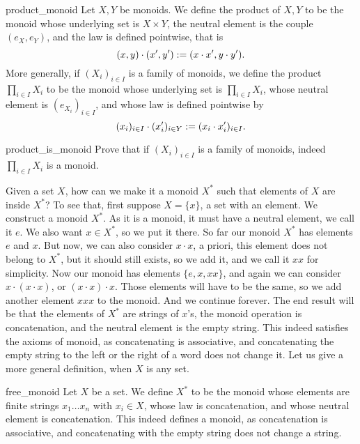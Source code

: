 \begin{cdef}{}{product_monoid}
    Let \( X, Y \) be monoids. We define the product of \( X, Y \) to be the monoid whose underlying set is \( X \times Y \), the neutral element is the couple \( (e_X, e_Y) \), and the law is defined pointwise, that is 
    \begin{equation*}
        (x, y) \cdot (x', y') := (x\cdot x', y \cdot y').
    \end{equation*}
    More generally, if \( (X_i)_{i\in I} \) is a family of monoids, we define the product \( \prod_{i \in I} X_i \) to be the monoid whose underlying set is \( \prod_{i \in I} X_i \), whose neutral element is \( (e_{X_i})_{i \in I} \), and whose law is defined pointwise by
    \begin{equation*}
        (x_i)_{i \in I} \cdot (x'_i)_{i \in Y} := (x_i \cdot x'_i)_{i \in I}.
    \end{equation*}
\end{cdef}

\begin{cex}{}{product_is_monoid}
    Prove that if \( (X_i)_{i\in I} \) is a family of monoids, indeed \( \prod_{i \in I} X_i \) is a monoid.
\end{cex}

Given a set \( X \), how can we make it a monoid \( X^* \) such that elements of \( X \) are inside \( X^* \)? To see that, first suppose \( X = \{ x \} \), a set with an element. We construct a monoid \( X^* \). As it is a monoid, it must have a neutral element, we call it \( e \). We also want \( x \in X^* \), so we put it there. So far our monoid \( X^* \) has elements \( e \) and \( x \). But now, we can also consider \( x\cdot x \), a priori, this element does not belong to \( X^* \), but it should still exists, so we add it, and we call it \( xx \) for simplicity. Now our monoid has elements \( \{ e, x, xx \} \), and again we can consider \( x \cdot (x\cdot x) \), or \( (x \cdot x) \cdot x \). Those elements will have to be the same, so we add another element \( xxx \) to the monoid. And we continue forever. The end result will be that the elements of \( X^* \) are strings of \( x \)'s, the monoid operation is concatenation, and the neutral element is the empty string. This indeed satisfies the axioms of monoid, as concatenating is associative, and concatenating the empty string to the left or the right of a word does not change it. Let us give a more general definition, when \( X \) is any set.

\begin{cdef}{}{free_monoid}
    Let \( X \) be a set. We define \( X^* \) to be the monoid whose elements are finite strings \( x_1 \dots x_n \) with \( x_i \in X \), whose law is concatenation, and whose neutral element is concatenation. This indeed defines a monoid, as concatenation is associative, and concatenating with the empty string does not change a string.
\end{cdef}

